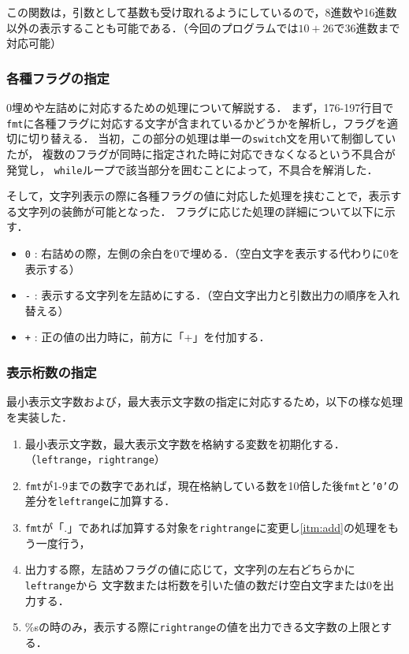 \documentclass[a4j,11pt]{jarticle}
\begin{document}
この関数は，引数として基数も受け取れるようにしているので，8進数や16進数以外の表示することも可能である．（今回のプログラムでは$10 + 26$で36進数まで対応可能）

\subsubsection{各種フラグの指定}
0埋めや左詰めに対応するための処理について解説する．
まず，176-197行目で{{\tt fmt}}に各種フラグに対応する文字が含まれているかどうかを解析し，フラグを適切に切り替える．
当初，この部分の処理は単一の{{\tt switch}}文を用いて制御していたが，
複数のフラグが同時に指定された時に対応できなくなるという不具合が発覚し，
{{\tt while}}ループで該当部分を囲むことによって，不具合を解消した．

そして，文字列表示の際に各種フラグの値に対応した処理を挟むことで，表示する文字列の装飾が可能となった．
フラグに応じた処理の詳細について以下に示す．
\begin{itemize}
      \item {{\tt 0}} : 右詰めの際，左側の余白を0で埋める．（空白文字を表示する代わりに$0$を表示する）
      \item {{\tt -}} : 表示する文字列を左詰めにする．（空白文字出力と引数出力の順序を入れ替える）
      \item {{\tt +}} : 正の値の出力時に，前方に「+」を付加する．
\end{itemize}

\subsubsection{表示桁数の指定}
最小表示文字数および，最大表示文字数の指定に対応するため，以下の様な処理を実装した．

\begin{enumerate}
      \item 最小表示文字数，最大表示文字数を格納する変数を初期化する．（{{\tt leftrange}}，{{\tt rightrange}}）
      \item \label{itm:add}{{\tt fmt}}が1-9までの数字であれば，現在格納している数を10倍した後{{\tt *fmt}}と{{\tt '0'}}の差分を{{\tt leftrange}}に加算する．
      \item {{\tt fmt}}が「.」であれば加算する対象を{{\tt rightrange}}に変更し\ref{itm:add}の処理をもう一度行う，
      \item 出力する際，左詰めフラグの値に応じて，文字列の左右どちらかに{{\tt leftrange}}から
      文字数または桁数を引いた値の数だけ空白文字または0を出力する．
      \item \%sの時のみ，表示する際に{{\tt rightrange}}の値を出力できる文字数の上限とする．
\end{enumerate}
\end{document}
